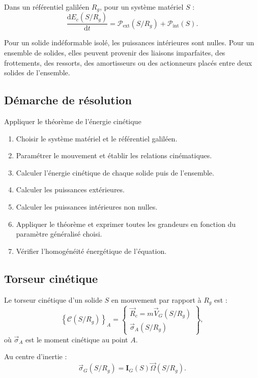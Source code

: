 Dans un référentiel galiléen $R_g$, pour un système matériel $S$ :
\[
\frac{\mathrm d E_c(S/R_g)}{\mathrm dt}
=\mathcal P_{\mathrm{ext}}(S/R_g)
+\mathcal P_{\mathrm{int}}(S).
\]

\TLEnergiePuissance

Pour un solide indéformable isolé, les puissances intérieures sont nulles. Pour un ensemble de solides, elles peuvent provenir des liaisons imparfaites, des frottements, des ressorts, des amortisseurs ou des actionneurs placés entre deux solides de l'ensemble.

\subsection{Démarche de résolution}

\begin{TLMethod}{Appliquer le théorème de l'énergie cinétique}
\begin{enumerate}
  \item Choisir le système matériel et le référentiel galiléen.
  \item Paramétrer le mouvement et établir les relations cinématiques.
  \item Calculer l'énergie cinétique de chaque solide puis de l'ensemble.
  \item Calculer les puissances extérieures.
  \item Calculer les puissances intérieures non nulles.
  \item Appliquer le théorème et exprimer toutes les grandeurs en fonction du paramètre généralisé choisi.
  \item Vérifier l'homogénéité énergétique de l'équation.
\end{enumerate}
\end{TLMethod}

\subsection{Torseur cinétique}

Le torseur cinétique d'un solide $S$ en mouvement par rapport à $R_g$ est :
\[
\left\{\mathcal C(S/R_g)\right\}_A=
\left\{
\begin{array}{c}
\vec R_c=m\vec V_G(S/R_g)\\[1mm]
\vec\sigma_A(S/R_g)
\end{array}
\right\},
\]
où $\vec\sigma_A$ est le moment cinétique au point $A$.

Au centre d'inertie :
\[
\vec\sigma_G(S/R_g)=\mathbf I_G(S)\vec\Omega(S/R_g).
\]

